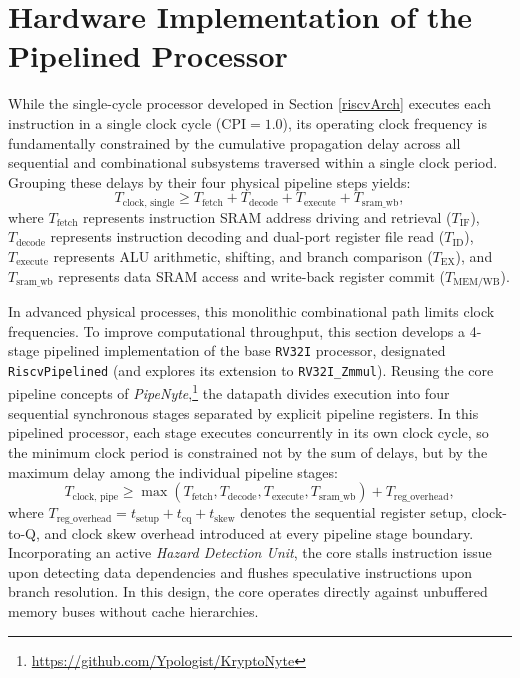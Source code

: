 
\section{Hardware Implementation of the Pipelined Processor}\label{riscvPipelined}

While the single-cycle processor developed in Section \ref{riscvArch} executes each instruction in a single clock cycle ($\text{CPI} = 1.0$), its operating clock frequency is fundamentally constrained by the cumulative propagation delay across all sequential and combinational subsystems traversed within a single clock period. Grouping these delays by their four physical pipeline steps yields:
\begin{equation}
T_{\text{clock, single}} \ge T_{\text{fetch}} + T_{\text{decode}} + T_{\text{execute}} + T_{\text{sram\_wb}},
\end{equation}
where $T_{\text{fetch}}$ represents instruction SRAM address driving and retrieval ($T_{\text{IF}}$), $T_{\text{decode}}$ represents instruction decoding and dual-port register file read ($T_{\text{ID}}$), $T_{\text{execute}}$ represents ALU arithmetic, shifting, and branch comparison ($T_{\text{EX}}$), and $T_{\text{sram\_wb}}$ represents data SRAM access and write-back register commit ($T_{\text{MEM/WB}}$).

In advanced physical processes, this monolithic combinational path limits clock frequencies. To improve computational throughput, this section develops a 4-stage pipelined implementation of the base \texttt{RV32I} processor, designated \texttt{RiscvPipelined} (and explores its extension to \texttt{RV32I\_Zmmul}). Reusing the core pipeline concepts of \textit{PipeNyte},\footnote{\url{https://github.com/Ypologist/KryptoNyte}} the datapath divides execution into four sequential synchronous stages separated by explicit pipeline registers. In this pipelined processor, each stage executes concurrently in its own clock cycle, so the minimum clock period is constrained not by the sum of delays, but by the maximum delay among the individual pipeline stages:
\begin{equation}
T_{\text{clock, pipe}} \ge \max\left(T_{\text{fetch}}, T_{\text{decode}}, T_{\text{execute}}, T_{\text{sram\_wb}}\right) + T_{\text{reg\_overhead}},
\end{equation}
where $T_{\text{reg\_overhead}} = t_{\text{setup}} + t_{\text{cq}} + t_{\text{skew}}$ denotes the sequential register setup, clock-to-Q, and clock skew overhead introduced at every pipeline stage boundary. Incorporating an active \textit{Hazard Detection Unit}, the core stalls instruction issue upon detecting data dependencies and flushes speculative instructions upon branch resolution. In this design, the core operates directly against unbuffered memory buses without cache hierarchies.


